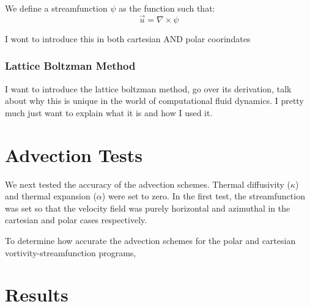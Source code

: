 \documentclass{article}
\begin{document}
We define a streamfunction $\psi$ as the function such that:
\begin{equation}
	\vec{u} = \nabla \times \psi
\end{equation}






I wont to introduce this in both cartesian AND polar coorindates


\subsubsection*{Lattice Boltzman Method}
I want to introduce the lattice boltzman method, go over its derivation, talk about why this is unique 
in the world of computational fluid dynamics. I pretty much just want to explain what it is and how I used it.
\newline


\section*{Advection Tests}

We next tested the accuracy of the advection schemes. Thermal diffusivity ($\kappa$) and thermal expansion ($\alpha$) were set to zero. In the first test, the streamfunction was set so that the velocity field was purely horizontal and azimuthal in the cartesian and polar cases respectively. 






To determine how accurate the advection schemes for the polar and cartesian vortivity-streamfunction programs, 


\section*{Results}

\section*{}
\end{document}
